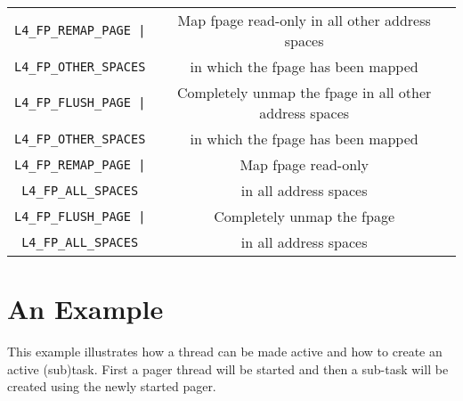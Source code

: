 \begin{itemize}
\begin{tabular}{|c|c|}
	{\footnotesize\verb+L4_FP_REMAP_PAGE |+} & 
	Map fpage read-only  in all other address spaces\\ 

	{\footnotesize\verb+L4_FP_OTHER_SPACES+} & 
	in which the fpage has been mapped\\ \hline

	{\footnotesize\verb+L4_FP_FLUSH_PAGE |+} & 
	Completely unmap the fpage in all other address spaces\\

	{\footnotesize\verb+L4_FP_OTHER_SPACES+} & 
	in which the fpage has been mapped \\ \hline

	{\footnotesize\verb+L4_FP_REMAP_PAGE |+} & 
	Map fpage read-only \\

	{\footnotesize\verb+L4_FP_ALL_SPACES+} & 
	in all address spaces\\ \hline

	{\footnotesize\verb+L4_FP_FLUSH_PAGE |+} & 
	Completely unmap the fpage \\

	{\footnotesize\verb+L4_FP_ALL_SPACES+} & 
	in all address spaces\\ \hline

	\end{tabular}

\end{itemize}

\cbend



\section{An Example}




This example illustrates how a thread can be made active and how to create an active (sub)task. First a pager thread will be started and then a sub-task will be created using the newly started pager.

